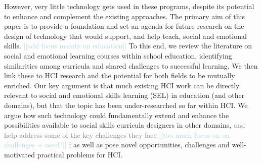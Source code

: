 \documentclass[prodmode,acmtochi]{acmsmall}
\newcommand{\todo}[1]{\textrm{\textrm{\textcolor{LightBlue}{[[#1]]} } } }
\newcommand{\GeraldineFIX}[1]{}
\newcommand{\rephrase}[1]{\textrm{\textrm{\textcolor{gray}{#1}}}}
\begin{document}
However, very little technology gets used in these programs, despite its potential to  enhance and complement the existing approaches.  
%
%
%
The primary aim of this paper is  to provide a foundation and set an agenda
for future research on the design of technology that would support, and help
teach, social and emotional skills. \todo{add focus mainly on education} To this end, we review the literature on social and emotional learning courses within school education, identifying similarities among curricula and shared challenges to successful learning. 
We then link these to HCI research %
and the potential for both fields to be mutually enriched. 
Our key argument is that much existing HCI work can be directly relevant to social and emotional skills learning (SEL) in education (and other domains), but that the topic has been under-researched so far within HCI. We argue how such technology could fundamentally extend and enhance the possibilities available to social skills curricula designers in other domains, \rephrase{and help address some of the key challenges they face} \todo{too much focus on on challenges + need?}; as well as pose novel opportunities, challenges and well-motivated practical problems for HCI. 



   
\end{document}
